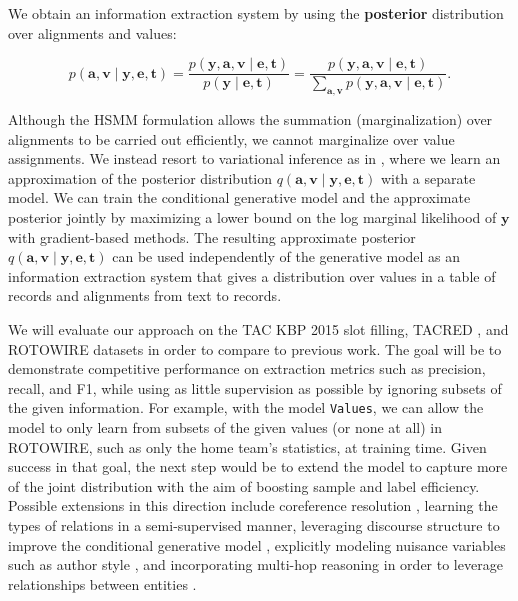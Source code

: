 \documentclass[12pt]{article}
\newcommand{\ba}{\mathbf{a}}
\newcommand{\be}{\mathbf{e}}
\newcommand{\bt}{\mathbf{t}}
\newcommand{\bv}{\mathbf{v}}
\newcommand{\by}{\mathbf{y}}
\begin{document}
We obtain an information extraction system by using the 
\textbf{posterior} distribution over alignments and values:
\begin{linenomath*}
$$
p(\ba,\bv\mid\by,\be,\bt)=\frac{p(\by,\ba,\bv\mid\be,\bt)}{p(\by\mid\be,\bt)}
=\frac{p(\by,\ba,\bv\mid\be,\bt)}{\sum_{\ba,\bv} p(\by,\ba,\bv\mid\be,\bt)}.
$$
\end{linenomath*}
Although the HSMM formulation allows the summation (marginalization) over alignments to be carried out efficiently,
we cannot marginalize over value assignments.
We instead resort to variational inference as in \citet{deng2018attn},
where we learn an approximation of the posterior distribution $q(\ba,\bv\mid\by,\be,\bt)$
with a separate model.
We can train the conditional generative model and the approximate posterior jointly 
by maximizing a lower bound on the log marginal likelihood of $\by$ with gradient-based methods.
The resulting approximate posterior $q(\ba,\bv\mid\by,\be,\bt)$ can be used independently of the 
generative model as an information extraction system that gives a distribution over
values in a table of records and alignments from text to records.

We will evaluate our approach on the 
TAC KBP 2015 slot filling, TACRED \citep{zhang2017slotfilling},
and ROTOWIRE \citep{wiseman2017d2t} datasets in order to compare to previous work.
The goal will be to demonstrate competitive performance on
extraction metrics such as precision, recall, and F1, while using as little supervision
as possible by ignoring subsets of the given information.
For example, with the model \texttt{Values}, we can allow the model to only learn from
subsets of the given values (or none at all) in ROTOWIRE, such as only
the home team's statistics, at training time.
Given success in that goal, the next step would be to extend the model
to capture more of the joint distribution with the aim of boosting sample and label efficiency.
Possible extensions in this direction include coreference resolution \citep{haghighi2010coref},
learning the types of relations in a semi-supervised manner,
leveraging discourse structure to improve the conditional generative model
\citep{sauper2009wiki}, explicitly modeling nuisance variables such as
author style \citep{hsu2017speech}, and incorporating multi-hop
reasoning in order to leverage relationships between entities
\citep{chen2018diva,rock17prove}.
\end{document}
